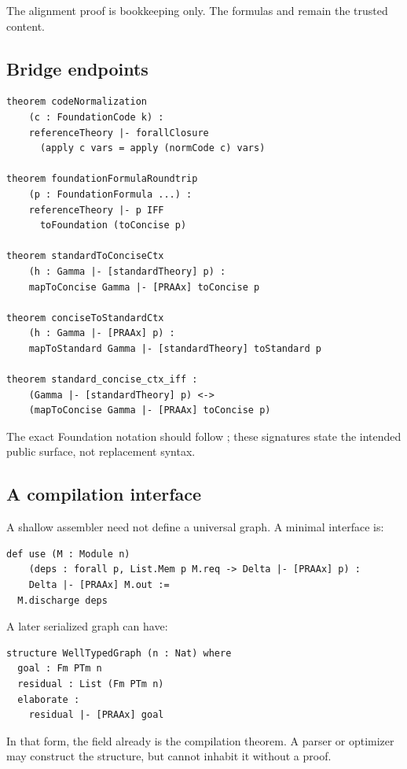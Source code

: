 The alignment proof is bookkeeping only.  The formulas and 
remain the trusted content.

\subsection{Bridge endpoints}

\begin{lstlisting}[language={}]
theorem codeNormalization
    (c : FoundationCode k) :
    referenceTheory |- forallClosure
      (apply c vars = apply (normCode c) vars)

theorem foundationFormulaRoundtrip
    (p : FoundationFormula ...) :
    referenceTheory |- p IFF
      toFoundation (toConcise p)

theorem standardToConciseCtx
    (h : Gamma |- [standardTheory] p) :
    mapToConcise Gamma |- [PRAAx] toConcise p

theorem conciseToStandardCtx
    (h : Gamma |- [PRAAx] p) :
    mapToStandard Gamma |- [standardTheory] toStandard p

theorem standard_concise_ctx_iff :
    (Gamma |- [standardTheory] p) <->
    (mapToConcise Gamma |- [PRAAx] toConcise p)
\end{lstlisting}

The exact Foundation notation should follow ; these signatures
state the intended public surface, not replacement syntax.

\subsection{A compilation interface}

A shallow assembler need not define a universal graph.  A minimal interface is:

\begin{lstlisting}[language={}]
def use (M : Module n)
    (deps : forall p, List.Mem p M.req -> Delta |- [PRAAx] p) :
    Delta |- [PRAAx] M.out :=
  M.discharge deps
\end{lstlisting}

A later serialized graph can have:
\begin{lstlisting}[language={}]
structure WellTypedGraph (n : Nat) where
  goal : Fm PTm n
  residual : List (Fm PTm n)
  elaborate :
    residual |- [PRAAx] goal
\end{lstlisting}
In that form, the field  already is the compilation theorem.
A parser or optimizer may construct the structure, but cannot inhabit it
without a proof.
